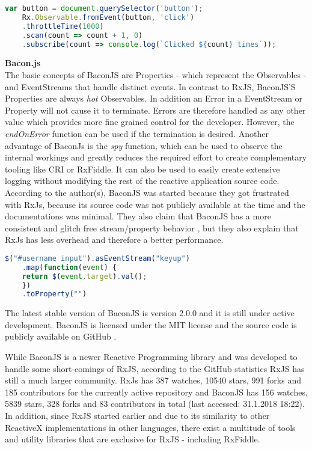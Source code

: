 	\begin{lstlisting}[language=JavaScript, caption={Example of RxJs code.},label={lst:Rx}]
	var button = document.querySelector('button');
	Rx.Observable.fromEvent(button, 'click')
	.throttleTime(1000)
	.scan(count => count + 1, 0)
	.subscribe(count => console.log(`Clicked ${count} times`));
	\end{lstlisting}
	
	\textbf{Bacon.js}\\
	The basic concepts of BaconJS \cite{BaconJS} are Properties - which represent the Observables - and EventStreams that handle distinct events. 
	In contrast to RxJS, BaconJS'S Properties are always \emph{hot} Observables. In addition an Error in a EventStream or Property will not cause it to terminate. Errors are therefore handled as any other value which provides more fine grained control for the developer. However, the \emph{endOnError} function can be used if the termination is desired. 
	Another advantage of BaconJs is the \emph{spy} function, which can be used to observe the internal workings and greatly reduces the required effort to create complementary tooling like CRI or RxFiddle. It can also be used to easily create extensive logging without modifying the rest of the reactive application source code. According to the author(s), BaconJS was started because they got frustrated with RxJs, because its source code was not publicly available at the time and the documentations was minimal. They also claim that BaconJS has a more consistent and glitch free stream/property behavior \cite{BaconJSRepo}, but they also explain that RxJs has less overhead and therefore a better performance. 
		\begin{lstlisting}[language=JavaScript, caption={Example of Bacon.js code.},label={lst:Bacon}]
	$("#username input").asEventStream("keyup")
	.map(function(event) {
	return $(event.target).val();
	})
	.toProperty("")
	\end{lstlisting}
	The latest stable version of BaconJS is version 2.0.0 and it is still under active development. BaconJS is licensed under the MIT license and the source code is publicly available on GitHub \cite{BaconJSRepo}.

	While BaconJS is a newer Reactive Programming library and was developed to handle some short-comings of RxJS, according to the GitHub statistics RxJS has still a much larger community. RxJs has 387 watches, 10540 stars, 991 forks and 185 contributors for the currently active repository and BaconJS has 156 watches, 5839 stars, 328 forks and 83 contributors in total (last accessed: 31.1.2018 18:22).
	In addition, since RxJS started earlier and due to its similarity to other ReactiveX implementations in other languages, there exist a multitude of tools and utility libraries that are exclusive for RxJS - including RxFiddle.

